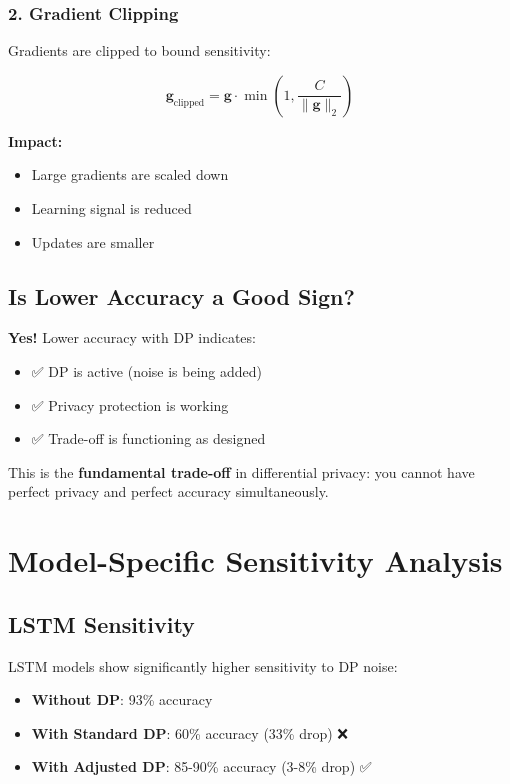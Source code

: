 \documentclass[12pt,a4paper]{article}
\begin{document}
\subsubsection{2. Gradient Clipping}

Gradients are clipped to bound sensitivity:

\begin{equation}
\mathbf{g}_{\text{clipped}} = \mathbf{g} \cdot \min\left(1, \frac{C}{\|\mathbf{g}\|_2}\right)
\end{equation}

\textbf{Impact:}
\begin{itemize}
    \item Large gradients are scaled down
    \item Learning signal is reduced
    \item Updates are smaller
\end{itemize}

\subsection{Is Lower Accuracy a Good Sign?}

\textbf{Yes!} Lower accuracy with DP indicates:

\begin{itemize}
    \item ✅ DP is active (noise is being added)
    \item ✅ Privacy protection is working
    \item ✅ Trade-off is functioning as designed
\end{itemize}

This is the \textbf{fundamental trade-off} in differential privacy: you cannot have perfect privacy and perfect accuracy simultaneously.

\section{Model-Specific Sensitivity Analysis}

\subsection{LSTM Sensitivity}

LSTM models show significantly higher sensitivity to DP noise:

\begin{itemize}
    \item \textbf{Without DP}: 93\% accuracy
    \item \textbf{With Standard DP}: 60\% accuracy (33\% drop) ❌
    \item \textbf{With Adjusted DP}: 85-90\% accuracy (3-8\% drop) ✅
\end{itemize}
\end{document}
